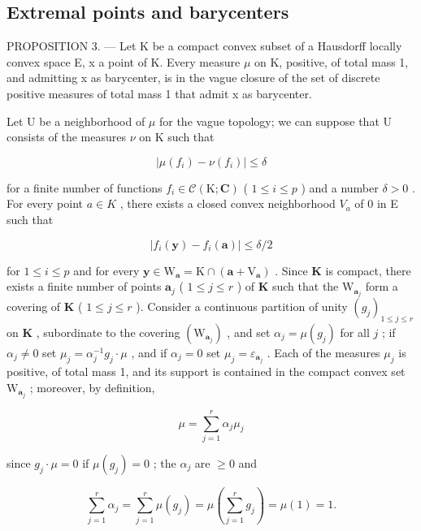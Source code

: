 \subsection{Extremal points and barycenters}

PROPOSITION 3. --- Let K be a compact convex subset of a Hausdorff locally convex space E, x a point of K. Every measure \(\mu\) on K, positive, of total mass 1, and admitting x as barycenter, is in the vague closure of the set of discrete positive measures of total mass 1 that admit x as barycenter.

Let U be a neighborhood of \(\mu\) for the vague topology; we can suppose that U consists of the measures \(\nu\) on K such that

\[
\left| \mu (f _ {i}) - \nu (f _ {i}) \right| \leqslant \delta\tag{1}
\]

for a finite number of functions \(f_{i} \in \mathcal{C}(\mathrm{K}; \mathbf{C})\) ( \(1 \leqslant i \leqslant p\) ) and a number \(\delta > 0\) . For every point \(a \in K\) , there exists a closed convex neighborhood \(V_{a}\) of 0 in E such that

\[
\left| f _ {i} (\mathbf {y}) - f _ {i} (\mathbf {a}) \right| \leqslant \delta / 2\tag{2}
\]

for \(1 \leqslant i \leqslant p\) and for every \(\mathbf{y} \in \mathrm{W}_{\mathbf{a}} = \mathrm{K} \cap (\mathbf{a} + \mathrm{V}_{\mathbf{a}})\) . Since \(\mathbf{K}\) is compact, there exists a finite number of points \(\mathbf{a}_j\) ( \(1 \leqslant j \leqslant r\) ) of \(\mathbf{K}\) such that the \(\mathrm{W}_{\mathbf{a}_j}\) form a covering of \(\mathbf{K}\) ( \(1 \leqslant j \leqslant r\) ). Consider a continuous partition of unity \((g_j)_{1 \leqslant j \leqslant r}\) on \(\mathbf{K}\) , subordinate to the covering \((\mathrm{W}_{\mathbf{a}_j})\) , and set \(\alpha_j = \mu(g_j)\) for all \(j\) ; if \(\alpha_j \neq 0\) set \(\mu_j = \alpha_j^{-1} g_j \cdot \mu\) , and if \(\alpha_j = 0\) set \(\mu_j = \varepsilon_{\mathbf{a}_j}\) . Each of the measures \(\mu_j\) is positive, of total mass 1, and its support is contained in the compact convex set \(\mathrm{W}_{\mathbf{a}_j}\) ; moreover, by definition,

\[
\mu = \sum_ {j = 1} ^ {r} \alpha_ {j} \mu_ {j}\tag{3}
\]

since \(g_{j} \cdot \mu = 0\) if \(\mu(g_{j}) = 0\) ; the \(\alpha_{j}\) are \(\geqslant 0\) and

\[
\sum_ {j = 1} ^ {r} \alpha_ {j} = \sum_ {j = 1} ^ {r} \mu (g _ {j}) = \mu \left(\sum_ {j = 1} ^ {r} g _ {j}\right) = \mu (1) = 1.
\]

